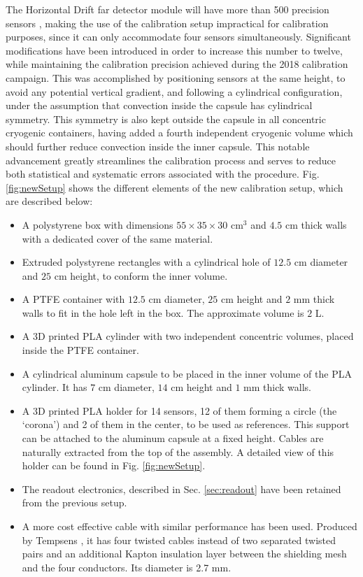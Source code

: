The Horizontal Drift far detector module will have more than 500 precision sensors \cite{dune_tdr4}, making the use of the calibration setup impractical for calibration purposes, since it can only accommodate four sensors simultaneously. Significant modifications have been introduced in order to increase this number to twelve, while maintaining the calibration precision achieved during the 2018 calibration campaign. This was accomplished by positioning sensors at the same height, to avoid any potential vertical gradient, and following a cylindrical configuration, under the assumption that convection inside the capsule has cylindrical symmetry.
This symmetry is also kept outside the capsule in all concentric cryogenic containers, having added a fourth independent cryogenic volume which should further reduce convection inside the inner capsule.
This notable advancement greatly streamlines the calibration process and serves to reduce both statistical and systematic errors associated with the procedure. Fig. \ref{fig:newSetup} shows the different elements of the new calibration setup, which are described below:

\begin{itemize}
    \item A polystyrene box with dimensions $55\times35\times30$ cm$^{3}$ and $4.5$ cm thick walls with a dedicated cover of the same material.
    \item Extruded polystyrene rectangles with a cylindrical hole of $12.5$ cm diameter and $25$ cm height, to conform the inner volume.
    \item A PTFE container with $12.5$ cm diameter, $25$ cm height and $2$ mm thick walls to fit in the hole left in the box. The approximate volume is $2$ L.
    \item A 3D printed PLA cylinder with two independent concentric volumes, placed inside the PTFE container.
    \item A cylindrical aluminum capsule to be placed in the inner volume of the PLA cylinder. It has $7$ cm diameter,  $14$ cm height and $1$ mm thick walls.
    \item A 3D printed PLA holder for 14 sensors, 12 of them forming a circle (the `corona') and 2 of them in the center, to be used as references. This support can be attached to the aluminum capsule at a fixed height. Cables are naturally extracted from the top of the assembly. A detailed view of this holder can be found in Fig. \ref{fig:newSetup}.
    \item The readout electronics, described in Sec. \ref{sec:readout} have been retained from the previous setup.
    \item A more cost effective cable with similar performance has been used. Produced by Tempsens \cite{tempsens}, it has four twisted cables instead of two separated twisted pairs and an additional Kapton insulation layer between the shielding mesh and the four conductors. Its diameter is 2.7 mm.
\end{itemize}

